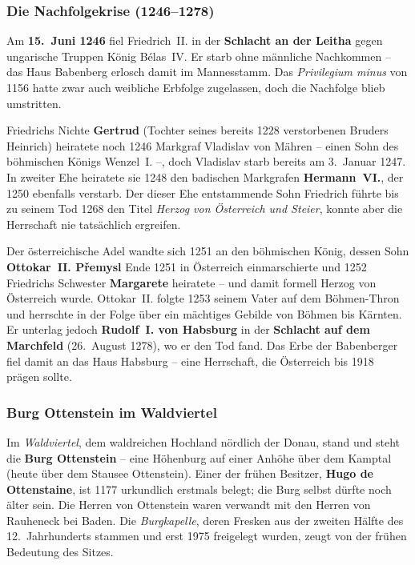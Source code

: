 \subsubsection{Die Nachfolgekrise (1246--1278)}

Am \textbf{15.~Juni 1246} fiel Friedrich~II. in der \textbf{Schlacht an der Leitha} gegen ungarische Truppen König Bélas~IV. Er starb ohne männliche Nachkommen -- das Haus Babenberg erlosch damit im Mannesstamm. Das \textit{Privilegium minus} von 1156 hatte zwar auch weibliche Erbfolge zugelassen, doch die Nachfolge blieb umstritten. \cite{lechner_babenberger,niederstaetter_oesterreich}

Friedrichs Nichte \textbf{Gertrud} (Tochter seines bereits 1228 verstorbenen Bruders Heinrich) heiratete noch 1246 Markgraf Vladislav von Mähren -- einen Sohn des böhmischen Königs Wenzel~I. --, doch Vladislav starb bereits am 3.~Januar 1247. In zweiter Ehe heiratete sie 1248 den badischen Markgrafen \textbf{Hermann~VI.}, der 1250 ebenfalls verstarb. Der dieser Ehe entstammende Sohn Friedrich führte bis zu seinem Tod 1268 den Titel \textit{Herzog von Österreich und Steier}, konnte aber die Herrschaft nie tatsächlich ergreifen. \cite{lechner_babenberger}

Der österreichische Adel wandte sich 1251 an den böhmischen König, dessen Sohn \textbf{Ottokar~II. Přemysl} Ende 1251 in Österreich einmarschierte und 1252 Friedrichs Schwester \textbf{Margarete} heiratete -- und damit formell Herzog von Österreich wurde. Ottokar~II. folgte 1253 seinem Vater auf dem Böhmen-Thron und herrschte in der Folge über ein mächtiges Gebilde von Böhmen bis Kärnten. Er unterlag jedoch \textbf{Rudolf~I. von Habsburg} in der \textbf{Schlacht auf dem Marchfeld} (26.~August 1278), wo er den Tod fand. Das Erbe der Babenberger fiel damit an das Haus Habsburg -- eine Herrschaft, die Österreich bis 1918 prägen sollte. \cite{lechner_babenberger,niederstaetter_oesterreich}

\subsubsection{Burg Ottenstein im Waldviertel}\label{burg_ottenstein}

Im \textit{Waldviertel}, dem waldreichen Hochland nördlich der Donau, stand und steht die \textbf{Burg Ottenstein} -- eine Höhenburg auf einer Anhöhe über dem Kamptal (heute über dem Stausee Ottenstein). Einer der frühen Besitzer, \textbf{Hugo de Ottenstaine}, ist 1177 urkundlich erstmals belegt; die Burg selbst dürfte noch älter sein. Die Herren von Ottenstein waren verwandt mit den Herren von Rauheneck bei Baden. Die \textit{Burgkapelle}, deren Fresken aus der zweiten Hälfte des 12.~Jahrhunderts stammen und erst 1975 freigelegt wurden, zeugt von der frühen Bedeutung des Sitzes. \cite{noe_burgen_online_ottenstein,reichhalter_kuehtreiber,burgen_austria_ottenstein}

